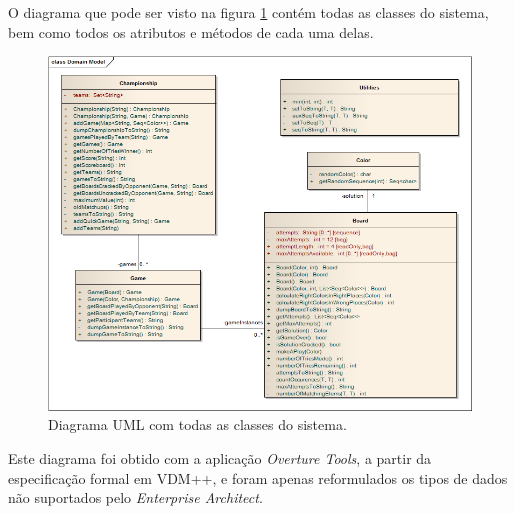 
O diagrama que pode ser visto na figura \ref{fig:diagrama_uml} contém
todas as classes do sistema, bem como todos os atributos e métodos de
cada uma delas.

\begin{figure}[h!]
  \centering
    \includegraphics[scale=0.5]{../uml/model.png}    
  \caption{Diagrama UML com todas as classes do sistema.}
  \label{fig:diagrama_uml}
\end{figure}

Este diagrama foi obtido com a aplicação \emph{Overture Tools},
a partir da especificação formal em VDM++, e foram apenas reformulados
os tipos de dados não suportados pelo \emph{Enterprise Architect}.
